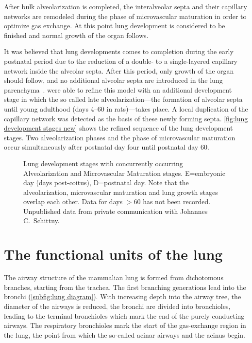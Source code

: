 After bulk alveolarization is completed, the interalveolar septa and their capillary networks are remodeled during the phase of microvascular maturation in order to optimize gas exchange. At this point lung development is considered to be finished and normal growth of the organ follows.

It was believed that lung developments comes to completion during the early postnatal period due to the reduction of a double- to a single-layered capillary network inside the alveolar septa. After this period, only growth of the organ should follow, and no additional alveolar septa are introduced in the lung parenchyma~\cite{Burri1999,Schittny2004}. \citet{Schittny2008} were able to refine this model with an additional development stage in which the so called late alveolarization---the formation of alveolar septa until young adulthood (days 4--60 in rats)---takes place. A local duplication of the capillary network was detected as the basis of these newly forming septa. \autoref{fig:lung development stages new} shows the refined sequence of the lung development stages. Two alveolarization phases and the phase of microvascular maturation occur simultaneously after postnatal day four until postnatal day 60.

\begin{figure}[htb]
	\noindent\makebox[\textwidth]{%
		\centering%
		}%
	\caption[Lung development stages]{Lung development stages with concurrently occurring Alveolarization and Microvascular Maturation stages. E=embryonic day (days post-coitus), D=postnatal day. Note that the alveolarization, microvascular maturation and lung growth stages overlap each other. Data for days $>$60 has not been recorded. Unpublished data from private communication with Johannes C.\ Schittny.}
	\label{fig:lung development stages new}
\end{figure}

\section{The functional units of the lung}
The airway structure of the mammalian lung is formed from dichotomous branches, starting from the trachea. The first branching generations lead into the bronchi (\autoref{subfig:lung diagram}). With increasing depth into the airway tree, the diameter of the airways is reduced, the bronchi are divided into bronchioles, leading to the terminal bronchioles which mark the end of the purely conducting airways. The respiratory bronchioles mark the start of the gas-exchange region in the lung, the point from which the so-called acinar airways and the acinus begin. 

